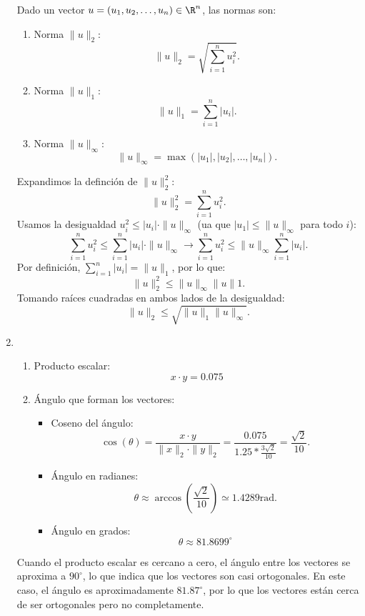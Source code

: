 \begin{enumerate}[label=\color{red}\textbf{\arabic*)}]
    Dado un vector $u=(u_1,u_2,\dots,u_n)\in \R^n$, las normas son: 
    \begin{enumerate}[label=\arabic*)]
        \item Norma $\|u\|_2$:  \[
        \|u\|_2=\sqrt{\sum_{i=1}^{n} u_i^2} .
        \] 
    \item Norma $\|u\|_1$:  \[
    \|u\|_1=\sum_{i=1}^{n} |u_i|.
    \] 
\item Norma $\|u\|_\infty$: \[
\|u\|_\infty=\max(|u_1|,|u_2|,\dots,|u_n|).
\] 
    \end{enumerate}
    Expandimos la definción de $\|u\|_2^2$: \[
    \|u\|_2^2=\sum_{i=1}^{n} u_i^2.
    \] 
    Usamos la desigualdad $u_i^2\le |u_i|\cdot \|u\|_\infty$ (ua que $|u_1|\le \|u\|_{\infty}$ para todo $i$): \[
    \sum_{i=1}^{n} u_i^2\le  \sum_{i=1}^{n} |u_i|\cdot \|u\|_\infty\longrightarrow \sum_{i=1}^{n} u_i^2\le \|u\|_\infty \sum_{i=1}^{n} |u_i|.
    \] 
    Por definición, $\sum_{i=1}^{n} |u_i|=\|u\|_1$, por lo que: \[
    \|u\|_2^2\le \|u\|_\infty\|u\|1.
    \] 
Tomando raíces cuadradas en ambos lados de la desigualdad: \[
\|u\|_2\le \sqrt{\|u\|_1\|u\|_\infty}. 
\] 
\item {}

    \begin{enumerate}[label=\arabic*)]
        \item  Producto escalar: \[
        x\cdot y=0.075
        \] 
    \item Ángulo que forman los vectores:
        \begin{itemize}[label=\textbullet]
            \item Coseno del ángulo: \[
            \cos(\theta)= \dfrac{x\cdot y}{\|x\|_2\cdot \|y\|_2}=\dfrac{0.075}{1.25* \frac{3\sqrt{2} }{10} }=\dfrac{\sqrt{2} }{10}. 
            \] 
        \item Ángulo en radianes: \[
        \theta \approx \arccos \left( \dfrac{\sqrt{2} }{10} \right) \simeq 1.4289 \mathrm{rad}.
        \] 
    \item Ángulo en grados: \[
    \theta\approx 81.8699^\circ
    \] 
        \end{itemize}
    \end{enumerate}
    Cuando el producto escalar es cercano a cero, el ángulo entre los vectores se aproxima a $90^\circ$, lo que indica que los vectores son casi ortogonales. En este caso, el ángulo es aproximadamente  $81.87^\circ$, por lo que los vectores están cerca de ser ortogonales pero no completamente.


\end{enumerate}
